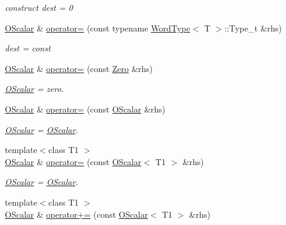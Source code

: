\begin{DoxyCompactItemize}
\begin{DoxyCompactList}\small\item\em construct dest = 0 \end{DoxyCompactList}\item 
\mbox{\hyperlink{classENSEM_1_1OScalar}{O\+Scalar}} \& \mbox{\hyperlink{classENSEM_1_1OScalar_a88bbb49d2879dba60c29d7792a8af8dc}{operator=}} (const typename \mbox{\hyperlink{structENSEM_1_1WordType}{Word\+Type}}$<$ T $>$\+::Type\+\_\+t \&rhs)
\begin{DoxyCompactList}\small\item\em dest = const \end{DoxyCompactList}\item 
\mbox{\hyperlink{classENSEM_1_1OScalar}{O\+Scalar}} \& \mbox{\hyperlink{classENSEM_1_1OScalar_a4fdfed29e219b358e05588826e672932}{operator=}} (const \mbox{\hyperlink{structENSEM_1_1Zero}{Zero}} \&rhs)
\begin{DoxyCompactList}\small\item\em \mbox{\hyperlink{classENSEM_1_1OScalar}{O\+Scalar}} = zero. \end{DoxyCompactList}\item 
\mbox{\hyperlink{classENSEM_1_1OScalar}{O\+Scalar}} \& \mbox{\hyperlink{classENSEM_1_1OScalar_a7c36649387edf21f3fa19f9ae63d4aca}{operator=}} (const \mbox{\hyperlink{classENSEM_1_1OScalar}{O\+Scalar}} \&rhs)
\begin{DoxyCompactList}\small\item\em \mbox{\hyperlink{classENSEM_1_1OScalar}{O\+Scalar}} = \mbox{\hyperlink{classENSEM_1_1OScalar}{O\+Scalar}}. \end{DoxyCompactList}\item 
{\footnotesize template$<$class T1 $>$ }\\\mbox{\hyperlink{classENSEM_1_1OScalar}{O\+Scalar}} \& \mbox{\hyperlink{classENSEM_1_1OScalar_aa6400023b45eed547bcb84c395fa1520}{operator=}} (const \mbox{\hyperlink{classENSEM_1_1OScalar}{O\+Scalar}}$<$ T1 $>$ \&rhs)
\begin{DoxyCompactList}\small\item\em \mbox{\hyperlink{classENSEM_1_1OScalar}{O\+Scalar}} = \mbox{\hyperlink{classENSEM_1_1OScalar}{O\+Scalar}}. \end{DoxyCompactList}\item 
{\footnotesize template$<$class T1 $>$ }\\\mbox{\hyperlink{classENSEM_1_1OScalar}{O\+Scalar}} \& \mbox{\hyperlink{classENSEM_1_1OScalar_a3109a05113cade86410bc77f60812023}{operator+=}} (const \mbox{\hyperlink{classENSEM_1_1OScalar}{O\+Scalar}}$<$ T1 $>$ \&rhs)

\end{DoxyCompactItemize}
